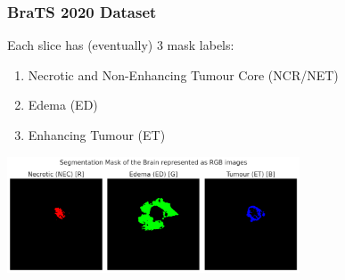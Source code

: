 \documentclass[../presentation.tex]{subfiles} %
\begin{document}
\begin{frame}

	\frametitle{BraTS 2020 Dataset}
    Each slice has (eventually) 3 mask labels:
    \begin{enumerate}
        \item Necrotic and Non-Enhancing Tumour Core (NCR/NET)
        \item Edema (ED)
        \item Enhancing Tumour (ET)
    \end{enumerate}
    \begin{center}
        \includegraphics[width=0.65\textwidth]{segmentation_mask.png}
    \end{center}

\end{frame}
\end{document}
